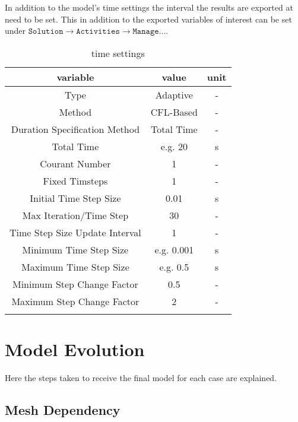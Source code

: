 \documentclass[../thesis.tex]{subfiles}
\begin{document}
In addition to the model's time settings the interval the results are exported at need to be set. This in addition to the exported variables of interest can be set under $\texttt{Solution} \rightarrow \texttt{Activities} \rightarrow \texttt{Manage...}$.

\begin{table} [htb]
	\centering
	\caption{time settings}
	\begin{tabular}{ ccc }
		\hline
		variable & value & unit \\
		\hline
		Type & Adaptive & - \\
		Method & CFL-Based & - \\
		Duration Specification Method & Total Time & -\\
		Total Time & e.g. 20 & s \\
		Courant Number & 1 & - \\
		Fixed Timsteps & 1 & - \\
		Initial Time Step Size & 0.01 & s \\
		Max Iteration/Time Step & 30 & - \\
		Time Step Size Update Interval & 1 & - \\
		Minimum Time Step Size & e.g. 0.001 & s \\
		Maximum Time Step Size & e.g. 0.5 & s \\
		Minimum Step Change Factor & 0.5 & - \\
		Maximum Step Change Factor & 2 & - \\		
		\hline
		\label{tab:ansys_setup_time}
	\end{tabular}
\end{table}

\section{Model Evolution}
\label{sec: mod_evol}

Here the steps taken to receive the final model for each case are explained.

\subsection{Mesh Dependency}
\label{sec: mesh_dep}
\end{document}
